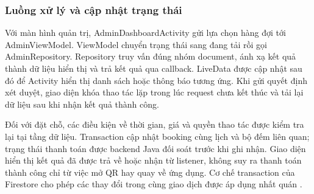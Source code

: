\subsubsection{Luồng xử lý và cập nhật trạng thái}
Với màn hình quản trị, AdminDashboardActivity gửi lựa chọn hàng đợi tới AdminViewModel. ViewModel chuyển trạng thái sang đang tải rồi gọi AdminRepository. Repository truy vấn đúng nhóm document, ánh xạ kết quả thành dữ liệu hiển thị và trả kết quả qua callback. LiveData được cập nhật sau đó để Activity hiển thị danh sách hoặc thông báo tương ứng. Khi gửi quyết định xét duyệt, giao diện khóa thao tác lặp trong lúc request chưa kết thúc và tải lại dữ liệu sau khi nhận kết quả thành công.

Đối với đặt chỗ, các điều kiện về thời gian, giá và quyền thao tác được kiểm tra lại tại tầng dữ liệu. Transaction cập nhật booking cùng lịch và bộ đếm liên quan; trạng thái thanh toán được backend Java đối soát trước khi ghi nhận. Giao diện hiển thị kết quả đã được trả về hoặc nhận từ listener, không suy ra thanh toán thành công chỉ từ việc mở QR hay quay về ứng dụng. Cơ chế transaction của Firestore cho phép các thay đổi trong cùng giao dịch được áp dụng nhất quán \parencite{firebase_transaction}.
